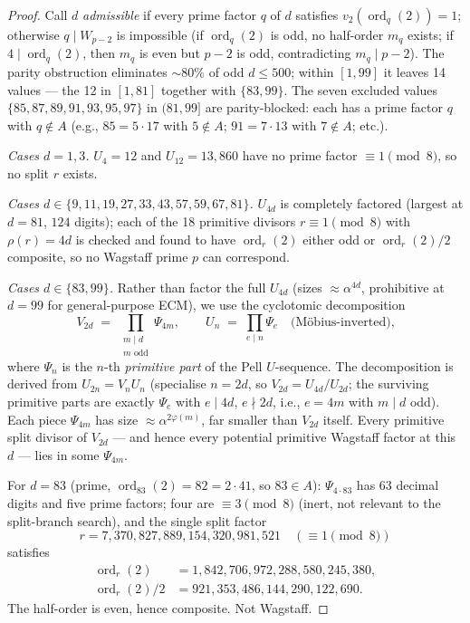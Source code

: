 \documentclass[11pt]{amsart}
\theoremstyle{plain}
\theoremstyle{definition}
\theoremstyle{remark}
\numberwithin{equation}{section}
\newcommand{\ord}{\operatorname{ord}}
\begin{document}
\begin{proof}
Call $d$ \emph{admissible} if every prime factor $q$ of $d$ satisfies $v_2(\ord_q(2)) = 1$; otherwise $q \mid W_{p-2}$ is impossible (if $\ord_q(2)$ is odd, no half-order $m_q$ exists; if $4 \mid \ord_q(2)$, then $m_q$ is even but $p - 2$ is odd, contradicting $m_q \mid p - 2$). The parity obstruction eliminates ${\sim}80\%$ of odd $d \leq 500$; within $[1, 99]$ it leaves 14 values --- the 12 in $[1, 81]$ together with $\{83, 99\}$. The seven excluded values $\{85, 87, 89, 91, 93, 95, 97\}$ in $(81, 99]$ are parity-blocked: each has a prime factor $q$ with $q \notin A$ (e.g., $85 = 5 \cdot 17$ with $5 \notin A$; $91 = 7 \cdot 13$ with $7 \notin A$; etc.).

\emph{Cases $d = 1, 3$.} $U_4 = 12$ and $U_{12} = 13{,}860$ have no prime factor $\equiv 1 \pmod 8$, so no split $r$ exists.

\emph{Cases $d \in \{9, 11, 19, 27, 33, 43, 57, 59, 67, 81\}$.} $U_{4 d}$ is completely factored (largest at $d = 81$, $124$ digits); each of the 18 primitive divisors $r \equiv 1 \pmod 8$ with $\rho(r) = 4 d$ is checked and found to have $\ord_r(2)$ either odd or $\ord_r(2)/2$ composite, so no Wagstaff prime $p$ can correspond.

\emph{Cases $d \in \{83, 99\}$.} Rather than factor the full $U_{4 d}$ (sizes $\approx \alpha^{4 d}$, prohibitive at $d = 99$ for general-purpose ECM), we use the cyclotomic decomposition
\[
  V_{2 d} \;=\; \prod_{\substack{m \mid d \\ m\text{ odd}}} \Psi_{4 m}, \qquad U_n \;=\; \prod_{e \mid n} \Psi_e \quad\text{(M\"obius-inverted),}
\]
where $\Psi_n$ is the $n$-th \emph{primitive part} of the Pell $U$-sequence. The decomposition is derived from $U_{2 n} = V_n U_n$ (specialise $n = 2 d$, so $V_{2 d} = U_{4 d}/U_{2 d}$; the surviving primitive parts are exactly $\Psi_e$ with $e \mid 4 d$, $e \nmid 2 d$, i.e., $e = 4 m$ with $m \mid d$ odd). Each piece $\Psi_{4 m}$ has size $\approx \alpha^{2 \varphi(m)}$, far smaller than $V_{2 d}$ itself. Every primitive split divisor of $V_{2 d}$ --- and hence every potential primitive Wagstaff factor at this $d$ --- lies in some $\Psi_{4 m}$.

For $d = 83$ (prime, $\ord_{83}(2) = 82 = 2 \cdot 41$, so $83 \in A$): $\Psi_{4 \cdot 83}$ has 63 decimal digits and five prime factors; four are $\equiv 3 \pmod 8$ (inert, not relevant to the split-branch search), and the single split factor
\[
  r = 7{,}370{,}827{,}889{,}154{,}320{,}981{,}521 \quad (\equiv 1 \pmod 8)
\]
satisfies
\[
  \begin{aligned}
  \ord_r(2) &= 1{,}842{,}706{,}972{,}288{,}580{,}245{,}380,\\
  \ord_r(2)/2 &= 921{,}353{,}486{,}144{,}290{,}122{,}690.
  \end{aligned}
\]
The half-order is even, hence composite. Not Wagstaff.


\end{proof}
\end{document}
